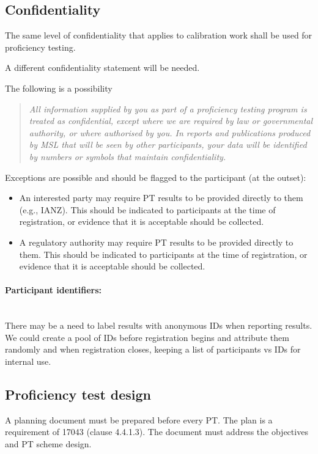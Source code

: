 \subsection{Confidentiality}
The same level of confidentiality that applies to calibration work shall be used for proficiency testing. 

A different confidentiality statement will be needed. 

The following is a possibility
\begin{quote}
\it
All information supplied by you as part of a proficiency testing program is treated as confidential, except where we are required by law or governmental authority, or where authorised by you. In reports and publications produced by MSL that will be seen by other participants, your data will be identified by numbers or symbols that maintain confidentiality.
\end{quote}

Exceptions are possible and should be flagged to the participant (at the outset):
\begin{itemize}
\item	An interested party may require PT results to be provided directly to them (e.g., IANZ). This should be indicated to participants at the time of registration, or evidence that it is acceptable should be collected.
\item	A regulatory authority may require PT results to be provided directly to them. This should be indicated to participants at the time of registration, or evidence that it is acceptable should be collected.

\end{itemize}


\paragraph{Participant identifiers:}\mbox{}\\
There may be a need to label results with anonymous IDs when reporting results. We could create a pool of IDs before registration begins and attribute them randomly and when registration closes, keeping a list of participants vs IDs for internal use.

\subsection{Proficiency test design}
\label{ss:PT_design}
A planning document must be prepared before every PT. The plan is a requirement of 17043 (clause 4.4.1.3).  The document must address the objectives and PT scheme design. 


